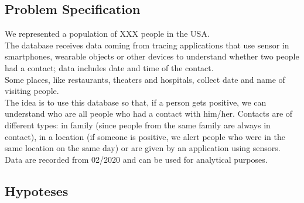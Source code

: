 \documentclass[12pt, a4paper]{article}
\begin{document}
\subsection{Problem Specification}

We represented a population of XXX  people in 
the USA. \\
The database receives data coming from tracing applications that use sensor in 
smartphones, wearable objects or other devices to understand whether two people 
had a contact; data includes date and time of the contact. \\  
Some places, like restaurants, theaters and hospitals, collect date and name of 
visiting people. \\
The idea is to use this database so that, if a person gets positive, we can 
understand who are all people who had a contact with him/her. Contacts are of 
different types: in family (since people from the same family are always in 
contact), in a location (if someone is positive, we alert people who were in 
the same location on the same day) or are given by an application using sensors. 
Data are recorded from 02/2020 and can be used for analytical purposes. 

\subsection{Hypoteses}
\end{document}

